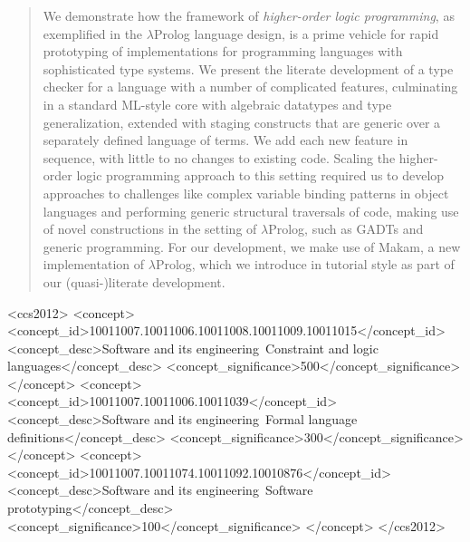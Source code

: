 \documentclass[acmsmall,screen]{acmart}
\begin{document}

\newcommand\tokkeyword[1]{#1}
\newcommand\toksymbol[1]{#1}
\newcommand\tokarrowtype[1]{#1}

\newcommand\toknumber[1]{#1}
\newcommand\tokstring[1]{#1}

\newcommand\tokmetavariable[1]{\colorthree{#1}}
\newcommand\toktypemetavariable[1]{#1}

\newcommand\tokbuiltintype[1]{\textbf{#1}}
\newcommand\tokstdtypeid[1]{#1}
\newcommand\toktypeid[1]{\colorone{#1}}

\newcommand\tokstdconst[1]{#1}
\newcommand\tokpropconst[1]{\colorfour{#1}}
\newcommand\tokobjconst[1]{\colortwo{#1}}
\newcommand\tokconst[1]{\colortwo{#1}}

\newcommand\tokquery[1]{#1}

\newcommand\tokcomment[1]{#1}
\newcommand\tokdirective[1]{#1}


\begin{abstract}
We demonstrate how the framework of \emph{higher-order logic programming}, as exemplified
in the $\lambda$Prolog language design, is a prime vehicle for rapid prototyping of
implementations for programming languages with sophisticated type systems. We present the
literate development of a type checker for a language with a number of complicated
features, culminating in a standard ML-style core with algebraic datatypes and
type generalization, extended with staging constructs that are generic over a
separately defined language of terms. We add each new feature in sequence,
with little to no changes to existing code. Scaling the
higher-order logic programming approach to this setting required us to develop
approaches to challenges like complex variable binding patterns in object languages
and performing generic structural traversals of code, making use of novel constructions
in the setting of $\lambda$Prolog, such as GADTs and generic programming. For our development,
we make use of Makam, a new implementation of $\lambda$Prolog, which we introduce in tutorial
style as part of our (quasi-)literate development.
\end{abstract}

 \begin{CCSXML}
<ccs2012>
<concept>
<concept_id>10011007.10011006.10011008.10011009.10011015</concept_id>
<concept_desc>Software and its engineering~Constraint and logic languages</concept_desc>
<concept_significance>500</concept_significance>
</concept>
<concept>
<concept_id>10011007.10011006.10011039</concept_id>
<concept_desc>Software and its engineering~Formal language definitions</concept_desc>
<concept_significance>300</concept_significance>
</concept>
<concept>
<concept_id>10011007.10011074.10011092.10010876</concept_id>
<concept_desc>Software and its engineering~Software prototyping</concept_desc>
<concept_significance>100</concept_significance>
</concept>
</ccs2012>
\end{CCSXML}
\end{document}
